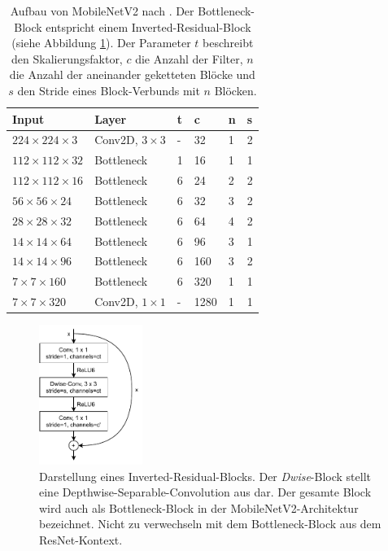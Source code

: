\begin{table}
    \begin{tabularx}{\textwidth}{l|l|l|l|l|l}
        \hline
        Input & Layer & t & c & n & s \\
        \hline
        $224 \times 224 \times 3$ & Conv2D, $3 \times 3$ & - & 32 & 1 & 2 \\
        $112 \times 112 \times 32$ & Bottleneck & 1 & 16 & 1 & 1 \\
        $112 \times 112 \times 16$ & Bottleneck & 6 & 24 & 2 & 2 \\
        $56 \times 56 \times 24$ & Bottleneck & 6 & 32 & 3 & 2 \\
        $28 \times 28 \times 32$ & Bottleneck & 6 & 64 & 4 & 2 \\
        $14 \times 14 \times 64$ & Bottleneck & 6 & 96 & 3 & 1 \\
        $14 \times 14 \times 96$ & Bottleneck & 6 & 160 & 3 & 2 \\
        $7 \times 7 \times 160$ & Bottleneck & 6 & 320 & 1 & 1 \\
        $7 \times 7 \times 320$ & Conv2D, $1 \times 1$ & - & 1280 & 1 & 1 \\
        \hline
    \end{tabularx}
    \caption{Aufbau von MobileNetV2 nach \cite{sandler2019mobilenetv2}. Der
    Bottleneck-Block entspricht einem Inverted-Residual-Block (siehe Abbildung
    \ref{fig:inverted-residual}). Der Parameter $t$ beschreibt den
    Skalierungsfaktor, $c$ die Anzahl der Filter, $n$ die Anzahl der aneinander
    geketteten Blöcke und $s$ den Stride eines Block-Verbunds mit $n$ Blöcken.}
    \label{table:mobilenetv2}
\end{table}

\begin{figure}
    \centering
    \includegraphics[width=0.3\textwidth]{images/inverted_residual.pdf}
    \caption{Darstellung eines Inverted-Residual-Blocks. Der \textit{Dwise}-Block stellt eine Depthwise-Separable-Convolution aus \cite{howard2017mobilenets} dar. Der gesamte Block wird auch als Bottleneck-Block in der MobileNetV2-Architektur bezeichnet. Nicht zu verwechseln mit dem Bottleneck-Block aus dem ResNet-Kontext.}
    \label{fig:inverted-residual}
\end{figure}

